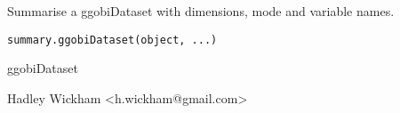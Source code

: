 \begin{Description}\relax
Summarise a ggobiDataset with dimensions, mode and variable names.
\end{Description}
\begin{Usage}
\begin{verbatim}summary.ggobiDataset(object, ...)\end{verbatim}
\end{Usage}
\begin{Arguments}
\begin{ldescription}
\item[\code{object}] ggobiDataset
\item[\code{...}] 
\end{ldescription}
\end{Arguments}
\begin{Details}\relax
\end{Details}
\begin{Author}\relax
Hadley Wickham <h.wickham@gmail.com>
\end{Author}
\begin{Examples}
\begin{ExampleCode}\end{ExampleCode}
\end{Examples}

